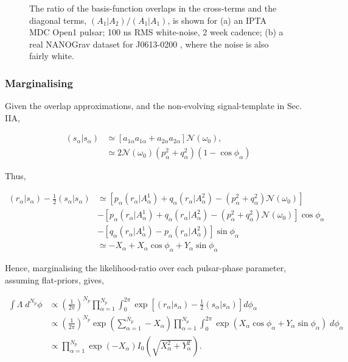 \documentclass[prd,showpacs,nofootinbib]{revtex4}
\newcommand{\incgraph}[3]{\texttt{[image: \#3]}}
\begin{document}
\begin{figure*}
   \subfloat[]{\incgraph{0}{0.5}{fig7a.pdf}} 
   \subfloat[]{\incgraph{0}{0.5}{fig7b.pdf}}
   \caption{\label{fig:overlap_ratios}The ratio of the basis-function overlaps in the cross-terms and the diagonal terms, $(A_1|A_2)/(A_1|A_1)$, is shown for (a) an IPTA MDC Open1 pulsar; 100 ns RMS white-noise, 2 week cadence; (b) a real NANOGrav dataset for J0613-0200 \citep{demorest2013}, where the noise is also fairly white.} 
 \end{figure*}

\subsubsection{Marginalising}

Given the overlap approximations, and the non-evolving signal-template in Sec. IIA,

\begin{align}
(s_{\alpha}|s_{\alpha}) &\simeq \left[a_{1{\alpha}}a_{1{\alpha}} + a_{2{\alpha}}a_{2{\alpha}}\right]\mathcal{N}(\omega_0), \nonumber\\
&\simeq 2\mathcal{N}(\omega_0)\left(p_{\alpha}^2+q_{\alpha}^2\right)\left(1-\cos\phi_{\alpha}\right)
\end{align}

Thus,

\begin{align}
(r_{\alpha}|s_{\alpha}) - \frac{1}{2}(s_{\alpha}|s_{\alpha}) &\simeq \left[p_{\alpha}(r_{\alpha}|A^1_{\alpha})+q_{\alpha}(r_{\alpha}|A^2_{\alpha}) - \left(p_{\alpha}^2+q_{\alpha}^2\right)\mathcal{N}(\omega_0)\right] \nonumber\\
&- \left[p_{\alpha}(r_{\alpha}|A^1_{\alpha})+q_{\alpha}(r_{\alpha}|A^2_{\alpha}) - \left(p_{\alpha}^2+q_{\alpha}^2\right)\mathcal{N}(\omega_0)\right]\cos\phi_{\alpha}  \nonumber\\
&- \left[q_{\alpha}(r_{\alpha}|A^1_{\alpha})-p_{\alpha}(r_{\alpha}|A^2_{\alpha})\right]\sin\phi_{\alpha}\nonumber\\
&\simeq  -X_{\alpha} + X_{\alpha}\cos\phi_{\alpha} + Y_{\alpha}\sin\phi_{\alpha}
\end{align}

Hence, marginalising the likelihood-ratio over each pulsar-phase parameter, assuming flat-priors, gives,

\begin{align}
\int\Lambda\;d^{N_p}\phi &\propto \left(\frac{1}{2\pi}\right)^{N_p}\prod_{\alpha=1}^{N_p}\int_0^{2\pi}\exp[(r_{\alpha}|s_{\alpha})-\frac{1}{2}(s_{\alpha}|s_{\alpha})]d\phi_{\alpha} \nonumber\\
&\propto \left(\frac{1}{2\pi}\right)^{N_p}\exp\left(\sum_{\alpha=1}^{N_p}-X_{\alpha}\right)\prod_{\alpha=1}^{N_p}\int_0^{2\pi}\exp(X_{\alpha}\cos\phi_{\alpha}+Y_{\alpha}\sin\phi_{\alpha})\;d\phi_{\alpha} \nonumber\\
&\propto \prod_{\alpha=1}^{N_p}\exp(-X_{\alpha})I_0\left(\sqrt{X_{\alpha}^2+Y_{\alpha}^2}\right).
\end{align}
\end{document}
